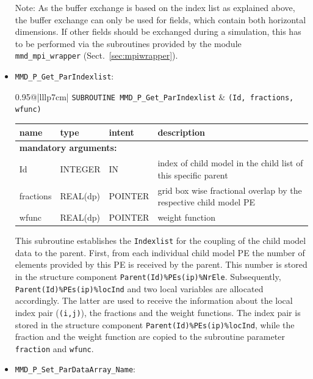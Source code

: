 \documentclass[twoside]{article}
\begin{document}
\begin{itemize}
Note: As the buffer exchange is based on the index list as explained above,
the buffer exchange can only be used for fields, which contain both horizontal
dimensions. If other fields should be exchanged during a simulation, this has to
be performed via the subroutines provided by the module \verb|mmd_mpi_wrapper|
(Sect.\ \ref{sec:mpiwrapper}).
\item \verb|MMD_P_Get_ParIndexlist|:\\
\vspace*{-0.3cm}

\begin{tabular*}{0.95\textwidth}{@{\extracolsep\fill}|lllp{7cm}|}
\hline
{}
{\tt  SUBROUTINE MMD\_P\_Get\_ParIndexlist} &
{\tt (Id, fractions, wfunc)}\\
\hline
\end{tabular*}
\begin{tabular*}{0.95\textwidth}{@{\extracolsep\fill}|lllp{7cm}|}
name & type & intent & description\\
\hline
\multicolumn{4}{|l|}{\bf mandatory arguments:}\\
Id & {\footnotesize INTEGER} & IN &  index of child model in the child
list of this specific parent \\
fractions &  {\footnotesize REAL(dp)} & {\footnotesize POINTER} &
grid box wise fractional overlap by the respective child model PE \\
wfunc &  {\footnotesize REAL(dp)} & {\footnotesize POINTER} & weight
function \\
\hline
\end{tabular*}
\smallskip

This subroutine establishes the \verb|Indexlist| for the coupling of the
child model data to the parent. First, from each individual child model PE
the number of elements provided by this PE is received by the parent.
This number is stored in the structure component 
\verb|Parent(Id)%PEs(ip)%NrEle|. Subsequently, 
\verb|Parent(Id)%PEs(ip)%locInd| and two local variables are allocated
accordingly. The latter are used to receive the information about the local
index pair (\verb|(i,j)|), the fractions and the weight
functions. The index pair is stored in the structure component 
\verb|Parent(Id)%PEs(ip)%locInd|, while the fraction and the weight
function are copied to the subroutine parameter \verb|fraction|
and \verb|wfunc|. 
\clearpage
\item \verb|MMD_P_Set_ParDataArray_Name|:\\
\vspace*{-0.3cm}


\end{itemize}
\end{document}

